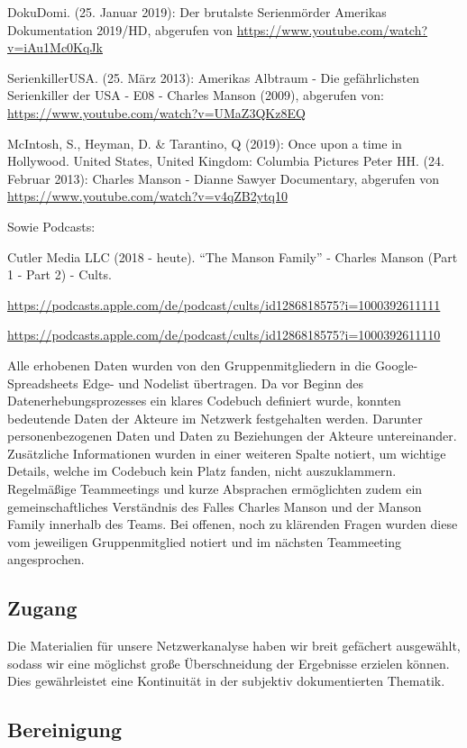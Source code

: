 \documentclass[
]{article}
\begin{document}
DokuDomi. (25. Januar 2019): Der brutalste Serienmörder Amerikas
\textbar{} Dokumentation 2019/HD, abgerufen von
\url{https://www.youtube.com/watch?v=iAu1Mc0KqJk}

SerienkillerUSA. (25. März 2013): Amerikas Albtraum - Die gefährlichsten
Serienkiller der USA - E08 - Charles Manson (2009), abgerufen von:
\url{https://www.youtube.com/watch?v=UMaZ3QKz8EQ}

McIntosh, S., Heyman, D. \& Tarantino, Q (2019): Once upon a time in
Hollywood. United States, United Kingdom: Columbia Pictures Peter HH.
(24. Februar 2013): Charles Manson - Dianne Sawyer Documentary,
abgerufen von \url{https://www.youtube.com/watch?v=v4qZB2ytq10}

Sowie Podcasts:

Cutler Media LLC (2018 - heute). ``The Manson Family'' - Charles Manson
(Part 1 - Part 2) - Cults.

\url{https://podcasts.apple.com/de/podcast/cults/id1286818575?i=1000392611111}

\url{https://podcasts.apple.com/de/podcast/cults/id1286818575?i=1000392611110}

Alle erhobenen Daten wurden von den Gruppenmitgliedern in die
Google-Spreadsheets Edge- und Nodelist übertragen. Da vor Beginn des
Datenerhebungsprozesses ein klares Codebuch definiert wurde, konnten
bedeutende Daten der Akteure im Netzwerk festgehalten werden. Darunter
personenbezogenen Daten und Daten zu Beziehungen der Akteure
untereinander. Zusätzliche Informationen wurden in einer weiteren Spalte
notiert, um wichtige Details, welche im Codebuch kein Platz fanden,
nicht auszuklammern. Regelmäßige Teammeetings und kurze Absprachen
ermöglichten zudem ein gemeinschaftliches Verständnis des Falles Charles
Manson und der Manson Family innerhalb des Teams. Bei offenen, noch zu
klärenden Fragen wurden diese vom jeweiligen Gruppenmitglied notiert und
im nächsten Teammeeting angesprochen.

\hypertarget{zugang}{%
\subsection{Zugang}\label{zugang}}

Die Materialien für unsere Netzwerkanalyse haben wir breit gefächert
ausgewählt, sodass wir eine möglichst große Überschneidung der
Ergebnisse erzielen können. Dies gewährleistet eine Kontinuität in der
subjektiv dokumentierten Thematik.

\hypertarget{bereinigung}{%
\subsection{Bereinigung}\label{bereinigung}}
\end{document}
